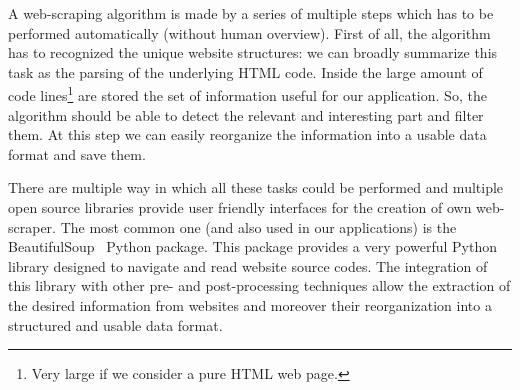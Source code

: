 \documentclass{standalone}
\begin{document}
A web-scraping algorithm is made by a series of multiple steps which has to be performed automatically (without human overview).
First of all, the algorithm has to recognized the unique website structures: we can broadly summarize this task as the parsing of the underlying HTML code.
Inside the large amount of code lines\footnote{
  Very large if we consider a pure HTML web page.
} are stored the set of information useful for our application.
So, the algorithm should be able to detect the relevant and interesting part and filter them.
At this step we can easily reorganize the information into a usable data format and save them.

There are multiple way in which all these tasks could be performed and multiple open source libraries provide user friendly interfaces for the creation of own web-scraper.
The most common one (and also used in our applications) is the \textsf{BeautifulSoup}~\cite{richardson2007beautiful} \textsf{Python} package.
This package provides a very powerful \textsf{Python} library designed to navigate and read website source codes.
The integration of this library with other pre- and post-processing techniques allow the extraction of the desired information from websites and moreover their reorganization into a structured and usable data format.
\end{document}

